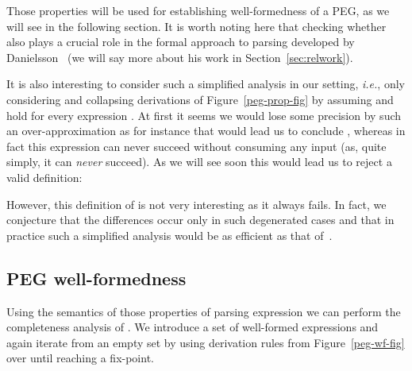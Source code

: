 \documentclass{LMCS}
\newcommand{\ie}{\textit{i.e.}}
\theoremstyle{definition}
\begin{document}
Those properties will be used for establishing well-formedness of a PEG, as we will see
in the following section. It is worth noting here that checking whether
 also plays a crucial role in the formal approach to parsing developed by
Danielsson~\cite{Dan10} (we will say more about his work in Section~\ref{sec:relwork}).

It is also interesting to consider such a simplified analysis in our setting, \ie,
only considering  and collapsing derivations of Figure~\ref{peg-prop-fig}
by assuming  and  hold for every expression . At first
it seems we would lose some precision by such an over-approximation as for instance
that would lead us to conclude , whereas in fact this
expression can never succeed without consuming any input (as, quite simply, it
can \emph{never} succeed). As we will see soon this would lead us to reject
a valid definition:

However, this definition of  is not very interesting as it always fails.
In fact, we conjecture that the differences occur only in such degenerated cases
and that in practice such a simplified analysis would be as efficient as that
of~\cite{For04}.

\subsection{PEG well-formedness}\label{sec:pegs-wf-wf}

Using the semantics of those properties of parsing expression we can perform the 
completeness analysis of . We introduce a set of well-formed expressions
 and again iterate from an empty set by using derivation rules from
Figure~\ref{peg-wf-fig} over  until reaching a fix-point. 
\end{document}
